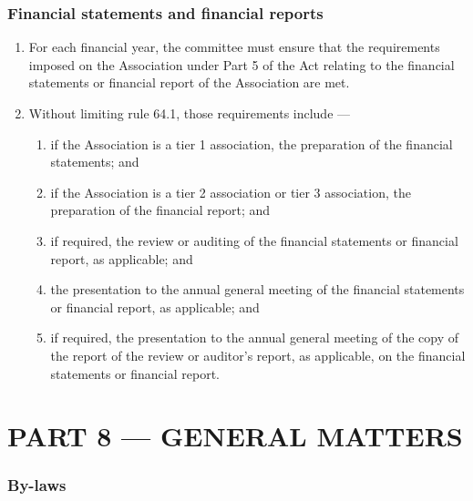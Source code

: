 \hypertarget{financial-statements-and-financial-reports}{%
\section{Financial statements and financial reports}\label{financial-statements-and-financial-reports}}

\begin{enumerate}

\item For each financial year, the committee must ensure that the requirements imposed on the Association under Part 5 of the Act relating to the financial statements or financial report of the Association are met.
\item Without limiting rule 64.1, those requirements include ---

  \begin{enumerate}
  
  \item if the Association is a tier 1 association, the preparation of the financial statements; and
  \item if the Association is a tier 2 association or tier 3 association, the preparation of the financial report; and
  \item if required, the review or auditing of the financial statements or financial report, as applicable; and
  \item the presentation to the annual general meeting of the financial statements or financial report, as applicable; and
  \item if required, the presentation to the annual general meeting of the copy of the report of the review or auditor's report, as applicable, on the financial statements or financial report.
  \end{enumerate}
\end{enumerate}

\hypertarget{part-8-general-matters}{%
\part{PART 8 --- GENERAL MATTERS}\label{part-8-general-matters}}

\hypertarget{by-laws}{%
\section{By-laws}\label{by-laws}}

